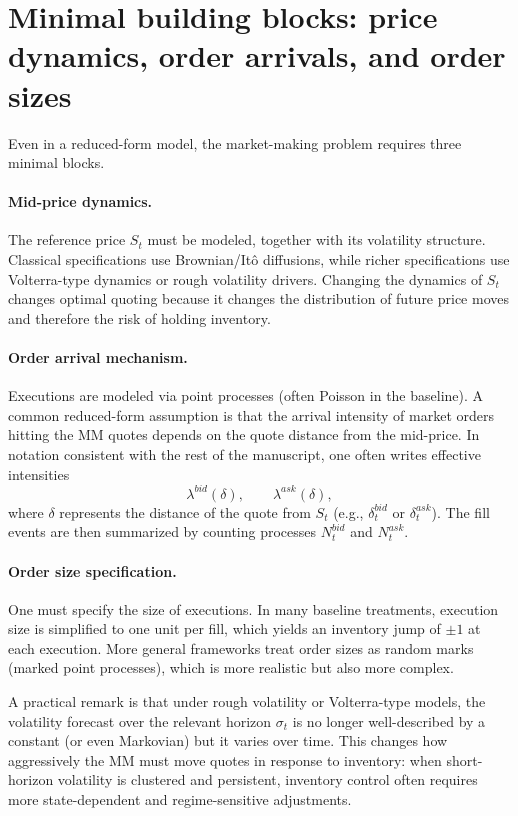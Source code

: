 \documentclass[a4paper,10pt,titlepage,oneside,openany]{book}
\theoremstyle{plain}\newtheorem{theorem}{Theorem}[chapter]
\theoremstyle{definition}\newtheorem{definition}{Definition}[chapter]
\theoremstyle{remark}\newtheorem{remark}{Remark}[chapter]
\begin{document}
\section{Minimal building blocks: price dynamics, order arrivals, and order sizes}
Even in a reduced-form model, the market-making problem requires three minimal blocks.

\paragraph{Mid-price dynamics.}
The reference price $S_t$ must be modeled, together with its volatility structure. Classical specifications use Brownian/It\^o diffusions, while richer specifications use Volterra-type dynamics or rough volatility drivers. Changing the dynamics of $S_t$ changes optimal quoting because it changes the distribution of future price moves and therefore the risk of holding inventory.

\paragraph{Order arrival mechanism.}
Executions are modeled via point processes (often Poisson in the baseline). A common reduced-form assumption is that the arrival intensity of market orders hitting the MM quotes depends on the quote distance from the mid-price. In notation consistent with the rest of the manuscript, one often writes effective intensities
\[
\lambda^{bid}(\delta), \qquad \lambda^{ask}(\delta),
\]
where $\delta$ represents the distance of the quote from $S_t$ (e.g., $\delta_t^{bid}$ or $\delta_t^{ask}$). The fill events are then summarized by counting processes $N_t^{bid}$ and $N_t^{ask}$.

\paragraph{Order size specification.}
One must specify the size of executions. In many baseline treatments, execution size is simplified to one unit per fill, which yields an inventory jump of $\pm 1$ at each execution. More general frameworks treat order sizes as random marks (marked point processes), which is more realistic but also more complex.

A practical remark is that under rough volatility or Volterra-type models, the volatility forecast over the relevant horizon $\sigma_t$ is no longer well-described by a constant (or even Markovian) but it varies over time. This changes how aggressively the MM must move quotes in response to inventory: when short-horizon volatility is clustered and persistent, inventory control often requires more state-dependent and regime-sensitive adjustments.
\end{document}
